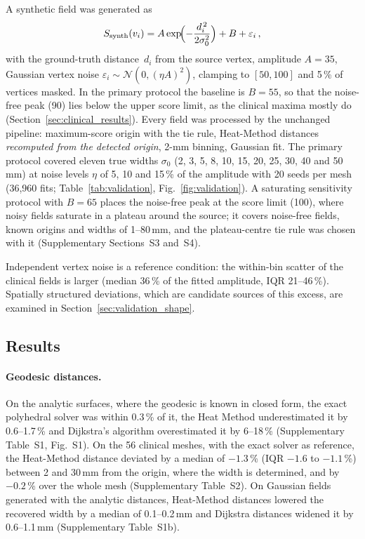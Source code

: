\documentclass[a4paper,fleqn]{cas-dc}
\begin{document}
A synthetic field was generated as
\begin{equation}
  S_{\mathrm{synth}}(v_i) = A\exp\!\Bigl(-\frac{d_i^{\,2}}
    {2\sigma_0^2}\Bigr) + B + \varepsilon_i\,,
  \label{eq:synth}
\end{equation}
with the ground-truth distance~$d_i$ from the source vertex, amplitude
$A = 35$, Gaussian vertex noise
$\varepsilon_i \sim \mathcal{N}(0, (\eta A)^2)$, clamping to
$[50, 100]$ and 5\,\% of vertices masked.  In the primary protocol the
baseline is $B = 55$, so that the noise-free peak (90) lies below the
upper score limit, as the clinical maxima mostly do
(Section~\ref{sec:clinical_results}).  Every field was processed by the
unchanged pipeline: maximum-score origin with the tie rule, Heat-Method
distances \emph{recomputed from the detected origin}, 2-mm binning,
Gaussian fit.  The primary protocol covered eleven true widths
$\sigma_0$ (2, 3, 5, 8, 10, 15, 20, 25, 30, 40 and 50\,mm) at noise
levels $\eta$ of 5, 10 and 15\,\% of the amplitude with 20 seeds per
mesh (36{,}960 fits; Table~\ref{tab:validation}, Fig.~\ref{fig:validation}).
A saturating sensitivity protocol with $B = 65$ places the noise-free
peak at the score limit (100), where noisy fields saturate in a plateau
around the source; it covers noise-free fields, known origins and widths
of 1--80\,mm, and the plateau-centre tie rule was chosen with it
(Supplementary Sections~S3 and~S4).

Independent vertex noise is a reference condition: the within-bin
scatter of the clinical fields is larger (median 36\,\% of the fitted
amplitude, IQR 21--46\,\%).  Spatially structured deviations, which are
candidate sources of this excess, are examined in
Section~\ref{sec:validation_shape}.

\subsection{Results}\label{sec:validation_results}
\paragraph{Geodesic distances.}
On the analytic surfaces, where the geodesic is known in closed form,
the exact polyhedral solver was within 0.3\,\% of it, the Heat Method
underestimated it by 0.6--1.7\,\% and Dijkstra's algorithm
overestimated it by 6--18\,\% (Supplementary Table~S1, Fig.~S1).  On
the 56 clinical meshes, with the exact solver as reference, the
Heat-Method distance deviated by a median of $-1.3$\,\% (IQR $-1.6$ to
$-1.1$\,\%) between 2 and 30\,mm from the origin, where the width is
determined, and by $-0.2$\,\% over the whole mesh (Supplementary
Table~S2).  On Gaussian fields generated with
the analytic distances, Heat-Method distances lowered the recovered
width by a median of 0.1--0.2\,mm and Dijkstra distances widened it by
0.6--1.1\,mm (Supplementary Table~S1b).
\end{document}
